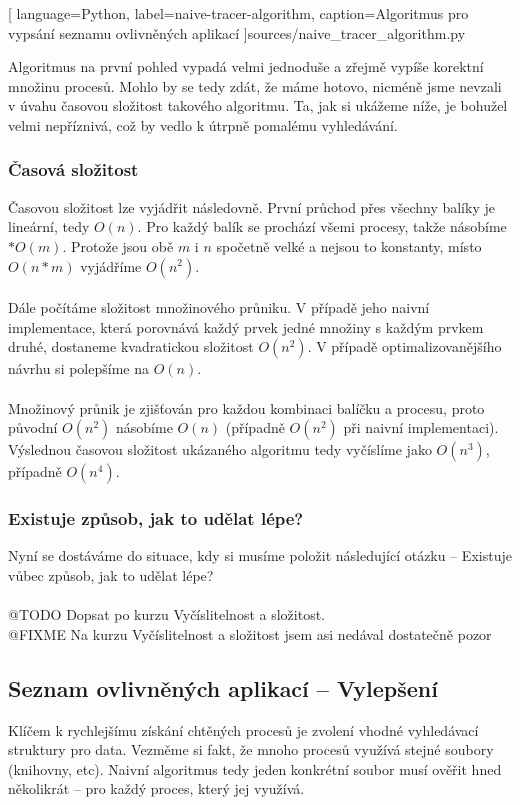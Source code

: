 \documentclass[10pt,a4paper]{article}
\begin{document}
		
		[
			language={Python},
			label=naive-tracer-algorithm,
			caption={Algoritmus pro vypsání seznamu ovlivněných aplikací}
		]{sources/naive_tracer_algorithm.py}

		Algoritmus na první pohled vypadá velmi jednoduše a zřejmě vypíše korektní množinu procesů. Mohlo by se tedy zdát, že máme hotovo, nicméně jsme nevzali v úvahu časovou složitost takového algoritmu. Ta, jak si ukážeme níže, je bohužel velmi nepříznivá, což by vedlo k útrpně pomalému vyhledávání.

			\subsubsection*{Časová složitost}
			Časovou složitost lze vyjádřit následovně. První průchod přes všechny balíky je lineární, tedy $O(n)$. Pro každý balík se prochází všemi procesy, takže násobíme $* O(m)$. Protože jsou obě $m$ i $n$ spočetně velké a nejsou to konstanty, místo $O(n*m)$ vyjádříme $O(n^2)$.
			\\
			\\
			Dále počítáme složitost množinového průniku. V případě jeho naivní implementace, která porovnává každý prvek jedné množiny s každým prvkem druhé, dostaneme kvadratickou složitost $O(n^2)$. V případě optimalizovanějšího návrhu si polepšíme na $O(n)$.
			\\
			\\
			Množinový průnik je zjišťován pro každou kombinaci balíčku a procesu, proto původní $O(n^2)$ násobíme $O(n)$ (případně $O(n^2)$ při naivní implementaci). Výslednou časovou složitost ukázaného algoritmu tedy vyčíslíme jako $O(n^3)$, případně $O(n^4)$.


			\subsubsection*{Existuje způsob, jak to udělat lépe?}
			Nyní se dostáváme do situace, kdy si musíme položit následující otázku -- Existuje vůbec způsob, jak to udělat lépe?
			\\
			\\
			@TODO Dopsat po kurzu Vyčíslitelnost a složitost.\\
			@FIXME Na kurzu Vyčíslitelnost a složitost jsem asi nedával dostatečně pozor

		\subsection{Seznam ovlivněných aplikací -- Vylepšení}
		Klíčem k rychlejšímu získání chtěných procesů je zvolení vhodné vyhledávací struktury pro data. Vezměme si fakt, že mnoho procesů využívá stejné soubory (knihovny, etc). Naivní algoritmus tedy jeden konkrétní soubor musí ověřit hned několikrát -- pro každý proces, který jej využívá.
\end{document}
